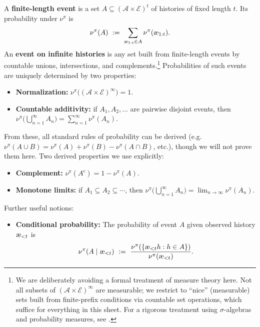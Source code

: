 \documentclass[fontsize=11pt, parskip=half]{scrartcl}
\newcommand{\cA}{\mathcal{A}}
\newcommand{\cE}{\mathcal{E}}
\newcommand{\aes}{\textnormal{\ae}}
\begin{document}
\begin{definition}\label{def:events}
A \textbf{finite-length event} is a set $A \subseteq (\cA \times \cE)^t$ of histories of fixed length $t$.
Its probability under $\nu^\pi$ is
\[
    \nu^\pi(A) ~:=~ \sum_{\aes_{1:t} \in A} \nu^\pi(\aes_{1:t}).
\]
An \textbf{event on infinite histories} is any set built from finite-length events by countable unions, intersections, and complements.\footnote{We are deliberately avoiding a formal treatment of measure theory here. Not all subsets of $(\cA \times \cE)^\infty$ are measurable; we restrict to ``nice'' (measurable) sets built from finite-prefix conditions via countable set operations, which suffice for everything in this sheet. For a rigorous treatment using $\sigma$-algebras and probability measures, see \cite[Chapter 2.2]{Hutter:24uaibook2}.}
Probabilities of such events are uniquely determined by two properties:
\begin{itemize}\itemsep=2pt
    \item \textbf{Normalization:} $\nu^\pi\!\big((\cA \times \cE)^\infty\big) = 1$.
    \item \textbf{Countable additivity:} if $A_1, A_2, \ldots$ are pairwise disjoint events, then $\nu^\pi\!\big(\bigcup_{n=1}^\infty A_n\big) = \sum_{n=1}^\infty \nu^\pi(A_n)$.
\end{itemize}
From these, all standard rules of probability can be derived (e.g.\ $\nu^\pi(A \cup B) = \nu^\pi(A) + \nu^\pi(B) - \nu^\pi(A \cap B)$, etc.), though we will not prove them here. Two derived properties we use explicitly:
\begin{itemize}\itemsep=2pt
    \item \textbf{Complement:} $\nu^\pi(A^c) = 1 - \nu^\pi(A)$.
    \item \textbf{Monotone limits:} if $A_1 \subseteq A_2 \subseteq \cdots$, then $\nu^\pi\!\big(\bigcup_{n=1}^\infty A_n\big) = \lim_{n \to \infty} \nu^\pi(A_n)$.
\end{itemize}
Further useful notions:
\begin{itemize}\itemsep=2pt
    \item \textbf{Conditional probability:} The probability of event $A$ given observed history $\aes_{<t}$ is
    \[
        \nu^\pi(A \mid \aes_{<t}) ~:=~ \frac{\nu^\pi(\{\aes_{<t} h : h \in A\})}{\nu^\pi(\aes_{<t})}.
    \]
\end{itemize}
\end{definition}
\end{document}
